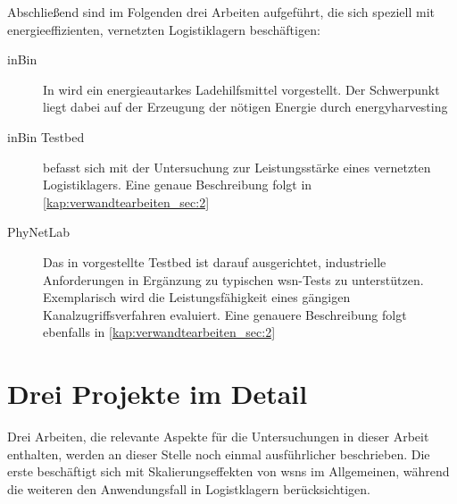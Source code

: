 Abschließend sind im Folgenden drei Arbeiten aufgeführt, die sich speziell mit energieeffizienten, vernetzten Logistiklagern beschäftigen:
\begin{description}

\item[inBin] In \cite{inBin} wird ein energieautarkes Ladehilfsmittel vorgestellt.
Der Schwerpunkt liegt dabei auf der Erzeugung der nötigen Energie durch \gls{energyharvesting}

\item[inBin Testbed] \cite{inBinTestbed} befasst sich mit der Untersuchung zur Leistungsstärke eines vernetzten Logistiklagers. Eine genaue Beschreibung folgt in \autoref{kap:verwandtearbeiten_sec:2}

\item[PhyNetLab] Das in \cite{Falkenberg2017b} vorgestellte Testbed  ist darauf ausgerichtet, industrielle Anforderungen in Ergänzung zu typischen \acs{wsn}-Tests zu unterstützen. Exemplarisch wird die Leistungsfähigkeit eines gängigen Kanalzugriffsverfahren evaluiert. Eine genauere Beschreibung folgt ebenfalls in \autoref{kap:verwandtearbeiten_sec:2}
\end{description}

\section{Drei Projekte im Detail}\label{kap:verwandtearbeiten_sec:2}

Drei Arbeiten, die relevante Aspekte für die Untersuchungen in dieser Arbeit enthalten, werden an dieser Stelle noch einmal ausführlicher beschrieben. Die erste beschäftigt sich mit Skalierungseffekten von \acsp{wsn} im Allgemeinen, während die weiteren den Anwendungsfall in Logistklagern berücksichtigen.

